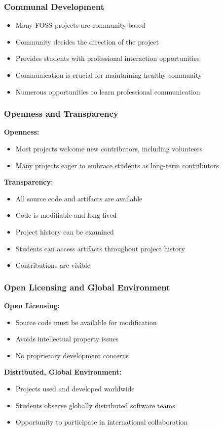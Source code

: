 \documentclass[aspectratio=169]{beamer}
\begin{document}
\begin{frame}
\frametitle{Communal Development}
\begin{itemize}
\item Many FOSS projects are community-based
\item Community decides the direction of the project
\item Provides students with professional interaction opportunities
\item Communication is crucial for maintaining healthy community
\item Numerous opportunities to learn professional communication
\end{itemize}
\end{frame}

\begin{frame}
\frametitle{Openness and Transparency}
\textbf{Openness:}
\begin{itemize}
\item Most projects welcome new contributors, including volunteers
\item Many projects eager to embrace students as long-term contributors
\end{itemize}

\textbf{Transparency:}
\begin{itemize}
\item All source code and artifacts are available
\item Code is modifiable and long-lived
\item Project history can be examined
\item Students can access artifacts throughout project history
\item Contributions are visible
\end{itemize}
\end{frame}

\begin{frame}
\frametitle{Open Licensing and Global Environment}
\textbf{Open Licensing:}
\begin{itemize}
\item Source code must be available for modification
\item Avoids intellectual property issues
\item No proprietary development concerns
\end{itemize}

\textbf{Distributed, Global Environment:}
\begin{itemize}
\item Projects used and developed worldwide
\item Students observe globally distributed software teams
\item Opportunity to participate in international collaboration
\end{itemize}
\end{frame}
\end{document}
